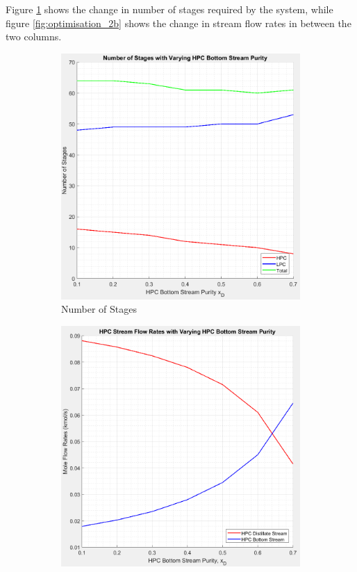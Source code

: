 \documentclass[11pt,oneside]{article}
\begin{document}
    \noindent Figure \ref{fig:optimisation_2a} shows the change in number of stages required by the system, while figure \ref{fig:optimisation_2b} shows the change in stream flow rates in between the two columns. \\
    \begin{figure}[ht]
        \centering
        \begin{subfigure}{0.49\textwidth}
            \includegraphics[width=\linewidth]{graph-stages_vs_HPCxB.jpeg}
            \caption{Number of Stages} \label{fig:optimisation_2a}
        \end{subfigure}
        \hspace*{\fill} %
        \begin{subfigure}{0.49\textwidth}
            \includegraphics[width=\linewidth]{graph-flowrate_vs_HPCxB.jpeg}

\end{subfigure}
\end{figure}
\end{document}
